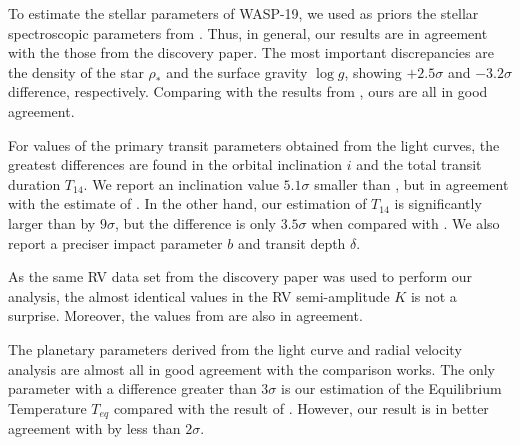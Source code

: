 To estimate the stellar parameters of WASP-19, we used as priors the stellar spectroscopic parameters from \cite{Hebb2010}. Thus, in general, our results are in agreement with the those from the discovery paper. The most important discrepancies are the density of the star $\rho_*$ and the surface gravity $\log{g}$, showing $+2.5\sigma$ and $-3.2\sigma$ difference, respectively. Comparing with the results from \cite{Lendl2013}, ours are all in good agreement.

For values of the primary transit parameters obtained from the light curves, the greatest differences are found in the orbital inclination $i$ and the total transit duration $T_{14}$. We report an inclination value $5.1\sigma$ smaller than \cite{Hebb2010}, but in agreement with the estimate of \cite{Lendl2013}. In the other hand, our estimation of $T_{14}$ is significantly larger than \cite{Hebb2010} by $9\sigma$, but the difference is only $3.5\sigma$ when compared with \cite{Lendl2013}. We also report a preciser impact parameter $b$ and transit depth $\delta$.

As the same RV data set from the discovery paper \citep{Hebb2010} was used to perform our analysis, the almost identical values in the RV semi-amplitude $K$ is not a surprise. Moreover, the values from \cite{Lendl2013} are also in agreement. 

The planetary parameters derived from the light curve and radial velocity analysis are almost all in good agreement with the comparison works. The only parameter with a difference greater than $3\sigma$ is our estimation of the Equilibrium Temperature $T_{eq}$ compared with the result of \cite{Hebb2010}. However, our result is in better agreement with \cite{Lendl2013} by less than $2\sigma$.

